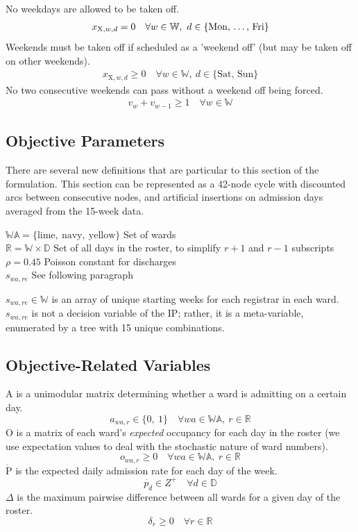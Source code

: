 \documentclass[a4paper]{article}
\begin{document}
No weekdays are allowed to be taken off.
\begin{align}
  x_{\text{X}, w, d} = 0 \quad\forall w\in \mathbb{W},\ d\in \{\text{Mon, \dots, Fri}\}
\end{align}
Weekends must be taken off if scheduled as a 'weekend off' (but may be taken off on other weekends).
\begin{align}
  x_{\text{X}, w, d} \ge 0 \quad\forall w\in \mathbb{W},\ d\in \{\text{Sat, Sun}\}
\end{align}
No two consecutive weekends can pass without a weekend off being forced.
\begin{align}
  v_w + v_{w-1} \ge 1 \quad\forall w\in \mathbb{W}
\end{align}

\subsection{Objective Parameters}

There are several new definitions that are particular to this section of the formulation. This section can be represented as a 42-node cycle with discounted arcs between consecutive nodes, and artificial insertions on admission days averaged from the 15-week data.

\begin{multicols}{2}
\begin{flushright}
$\mathbb{WA} = \{\text{lime},\ \text{navy},\ \text{yellow}\}$ \dotfill Set of wards\\
$\mathbb{R} = \mathbb{W}\times \mathbb{D}$ \dotfill Set of all days in the roster, to simplify $r+1$ and $r-1$ subscripts\\
$\rho = 0.45$ \dotfill Poisson constant for discharges\\
$s_{wa,re}$ \dotfill See following paragraph
\end{flushright}

$s_{wa, re} \in \mathbb{W}$ is an array of unique starting weeks for each registrar in each ward. $s_{wa, re}$ is not a decision variable of the IP; rather, it is a meta-variable, enumerated by a tree with 15 unique combinations.
\end{multicols}
\subsection{Objective-Related Variables}

A is a unimodular matrix determining whether a ward is admitting on a certain day.
$$a_{wa, r} \in \{0,\ 1\} \quad\forall wa\in \mathbb{WA},\ r\in \mathbb{R}$$
O is a matrix of each ward's \emph{expected} occupancy for each day in the roster (we use expectation values to deal with the stochastic nature of ward numbers).
$$o_{wa, r} \ge 0 \quad\forall wa\in \mathbb{WA},\ r\in \mathbb{R}$$
$\dot{\text{P}}$ is the expected daily admission rate for each day of the week.
$$\dot{p_{d}} \in Z^+ \quad\forall d\in \mathbb{D}$$
$\Delta$ is the maximum pairwise difference between all wards for a given day of the roster.
$$\delta_r \ge 0 \quad\forall r \in \mathbb{R}$$
\end{document}

